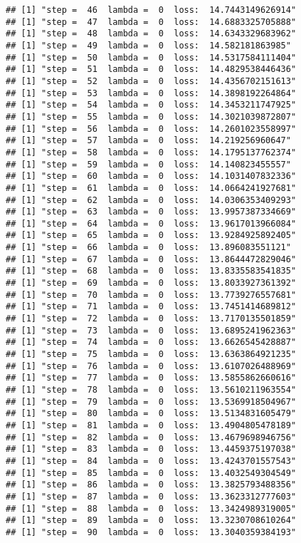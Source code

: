 \documentclass[
]{article}
\begin{document}
\begin{verbatim}
## [1] "step =  46  lambda =  0  loss:  14.7443149626914"
## [1] "step =  47  lambda =  0  loss:  14.6883325705888"
## [1] "step =  48  lambda =  0  loss:  14.6343329683962"
## [1] "step =  49  lambda =  0  loss:  14.582181863985"
## [1] "step =  50  lambda =  0  loss:  14.5317584111404"
## [1] "step =  51  lambda =  0  loss:  14.4829538446436"
## [1] "step =  52  lambda =  0  loss:  14.4356702151613"
## [1] "step =  53  lambda =  0  loss:  14.3898192264864"
## [1] "step =  54  lambda =  0  loss:  14.3453211747925"
## [1] "step =  55  lambda =  0  loss:  14.3021039872807"
## [1] "step =  56  lambda =  0  loss:  14.2601023558997"
## [1] "step =  57  lambda =  0  loss:  14.219256960647"
## [1] "step =  58  lambda =  0  loss:  14.1795137762374"
## [1] "step =  59  lambda =  0  loss:  14.140823455557"
## [1] "step =  60  lambda =  0  loss:  14.1031407832336"
## [1] "step =  61  lambda =  0  loss:  14.0664241927681"
## [1] "step =  62  lambda =  0  loss:  14.0306353409293"
## [1] "step =  63  lambda =  0  loss:  13.9957387334669"
## [1] "step =  64  lambda =  0  loss:  13.9617013966084"
## [1] "step =  65  lambda =  0  loss:  13.9284925892405"
## [1] "step =  66  lambda =  0  loss:  13.896083551121"
## [1] "step =  67  lambda =  0  loss:  13.8644472829046"
## [1] "step =  68  lambda =  0  loss:  13.8335583541835"
## [1] "step =  69  lambda =  0  loss:  13.8033927361392"
## [1] "step =  70  lambda =  0  loss:  13.7739276557681"
## [1] "step =  71  lambda =  0  loss:  13.7451414689812"
## [1] "step =  72  lambda =  0  loss:  13.7170135501859"
## [1] "step =  73  lambda =  0  loss:  13.6895241962363"
## [1] "step =  74  lambda =  0  loss:  13.6626545428887"
## [1] "step =  75  lambda =  0  loss:  13.6363864921235"
## [1] "step =  76  lambda =  0  loss:  13.6107026488969"
## [1] "step =  77  lambda =  0  loss:  13.5855862660616"
## [1] "step =  78  lambda =  0  loss:  13.5610211963554"
## [1] "step =  79  lambda =  0  loss:  13.5369918504967"
## [1] "step =  80  lambda =  0  loss:  13.5134831605479"
## [1] "step =  81  lambda =  0  loss:  13.4904805478189"
## [1] "step =  82  lambda =  0  loss:  13.4679698946756"
## [1] "step =  83  lambda =  0  loss:  13.4459375197038"
## [1] "step =  84  lambda =  0  loss:  13.4243701557543"
## [1] "step =  85  lambda =  0  loss:  13.4032549304549"
## [1] "step =  86  lambda =  0  loss:  13.3825793488356"
## [1] "step =  87  lambda =  0  loss:  13.3623312777603"
## [1] "step =  88  lambda =  0  loss:  13.3424989319005"
## [1] "step =  89  lambda =  0  loss:  13.3230708610264"
## [1] "step =  90  lambda =  0  loss:  13.3040359384193"

\end{verbatim}
\end{document}
